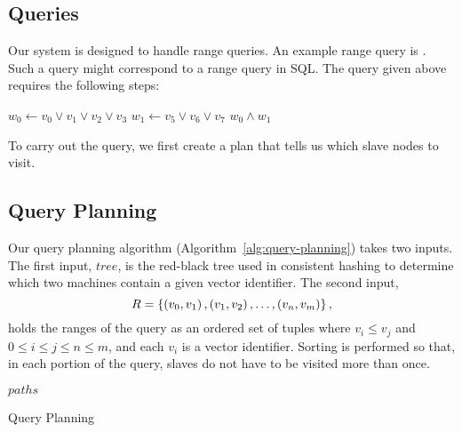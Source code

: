 \subsection{Queries}
Our system is designed to handle range queries. An example range query is
. Such a query might correspond to a range query in SQL.
The query given above requires the following steps:
\begin{algorithmic}
    \State $w_0 \gets v_0 \lor v_1 \lor v_2 \lor v_3$
    \State $w_1 \gets v_5 \lor v_6 \lor v_7$
    \State \Return $w_0 \land w_1$
\end{algorithmic}
To carry out the query, we first create a plan that tells us which slave nodes
to visit.
\subsection{Query Planning}
Our query planning algorithm (Algorithm~\ref{alg:query-planning}) takes two
inputs. The first input, \(tree\), is the red-black tree used in consistent
hashing to determine which two machines contain a given vector identifier. The
second input,
\[R = \left\{\left(v_0, v_1\right), \left(v_1, v_2\right), \ldots, \left(v_n, v_m\right)\right\},\]
holds the ranges of the query as an ordered set of tuples where
\(v_i \leq v_j\) and \(0 \leq i \leq j \leq n \leq m\), and each \(v_i\) is a
vector identifier. Sorting is performed so that, in each portion of the query,
slaves do not have to be visited more than once.
%
\begin{algorithm}
    \begin{algorithmic}
                    \Else
                    \EndIf
                \EndFor
            \EndFor
            \Return $paths$
        \EndProcedure
    \end{algorithmic}
    \caption{Query Planning}
    \label{alg:query-planning}
\end{algorithm}
%
